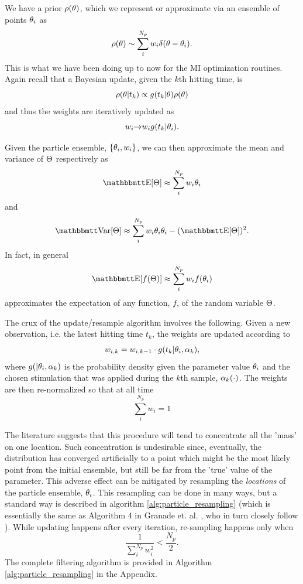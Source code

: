 \documentclass{article}
\begin{document}
We have a prior $ \rho({\theta})$, which we represent or approximate  via an ensemble
of points ${\theta}_i$ as $$ \rho({\theta}) \sim \sum_i^{N_p} w_i \delta({\theta}-{\theta}_i).$$
This is what we have been doing up to now for the MI optimization routines.
Again recall that a Bayesian update, given the $k$th hitting time, is $$
\rho({\theta}|t_k) \propto g(t_k|{\theta})\rho({\theta})$$
and thus the weights are iteratively updated as 
$$w_i {\rightarrow} w_i g(t_k|{\theta}_i).$$

Given the particle ensemble, $\{{\theta}_i, w_i\}$, we can  then approximate the
mean and variance of ${\Theta}$ respectively as
$$ \Exp[\Th] \approx \sum_i^{N_p} w_i \th_i$$
and 
$$ \Var[\Th] \approx \sum_i^{N_p} w_i \th_i \th_i - (\Exp[\Th])^2.$$
In fact, in general 
$$\Exp[f(\Th)]\approx\sum_i^{N_p} w_i f(\th_i)$$ approximates the expectation
of any function, $f$, of the random variable ${\Theta}$.

The crux of the update/resample algorithm involves the following. Given a new observation, i.e. the latest hitting time $t_k$, the weights are updated according to
$$ w_{i,k} = w_{i,k-1}\cdot g(t_k| {\theta}_i, {\alpha}_k),$$
where $g(|{\theta}_i, {\alpha}_k)$ is
the probability density given the parameter value ${\theta}_i$ and the chosen
stimulation that was applied during the $k$th sample, ${\alpha}_k(\cdot)$.
The weights are then re-normalized so that at all time $$\sum_i^{N_p} w_i = 1$$ 

The literature suggests that this procedure will tend to concentrate all the
'mass' on one location. Such concentration is undesirable since, eventually, the
distribution has converged  artificially to a point which might be the most
likely point from the initial ensemble, but still be far from the 'true' value
of the parameter. This adverse effect can be mitigated by resampling the {\sl
locations} of the particle ensemble, ${\theta}_i$. This resampling can be done in
many ways, but a standard way is described in algorithm
\ref{alg:particle_resampling} (which is essentially the same as Algorithm 4 in
Granade et. al. \cite{Granade2012}, who in turn closely follow \cite{Liu2001}).
While updating happens after every iteration, re-sampling happens only when $$
\frac{1}{\sum_i^{N_p} w_i^2} < \frac {N_p}{2}. $$ The complete filtering
algorithm is provided in Algorithm \ref{alg:particle_resampling} in the
Appendix.
\end{document}
